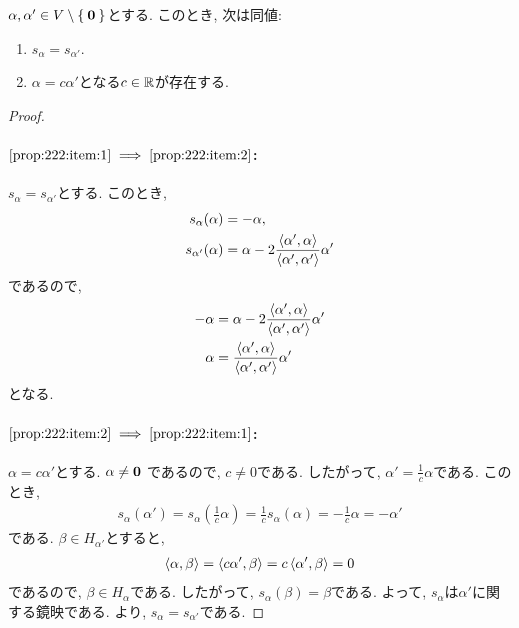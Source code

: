 \begin{prop}
  $\alpha, \alpha' \in V\setminus\Set{\boldsymbol{0}}$とする.
  このとき, 次は同値:
  \begin{enumerate}
  \item
    \label{prop:222:item:1}
    $s_\alpha=s_{\alpha'}$.
  \item
    \label{prop:222:item:2}
    $\alpha=c\alpha'$となる$c\in \mathbb{R}$が存在する.
  \end{enumerate}
\end{prop}
\begin{proof}
  \paragraph{ $\ref{prop:222:item:1}\implies\ref{prop:222:item:2}$:}
  $s_\alpha=s_{\alpha'}$とする.
  このとき,
  \begin{align*}
    s_\alpha(\alpha) &=-\alpha,\\
    s_{\alpha'} (\alpha) &= \alpha - 2\frac{\Braket{\alpha',\alpha}}{\Braket{\alpha',\alpha'}}\alpha'
  \end{align*}
  であるので,
  \begin{align*}
    -\alpha &= \alpha - 2\frac{\Braket{\alpha',\alpha}}{\Braket{\alpha',\alpha'}}\alpha'\\
    \alpha &= \frac{\Braket{\alpha',\alpha}}{\Braket{\alpha',\alpha'}}\alpha'
  \end{align*}
  となる.

  \paragraph{ $\ref{prop:222:item:2}\implies\ref{prop:222:item:1}$:}
  $\alpha=c\alpha'$とする.
  $\alpha\neq \boldsymbol{0}$
  であるので, $c\neq 0$である.
  したがって, $\alpha'=\frac{1}{c}\alpha$である.
  このとき,
  \begin{align*}
    s_{\alpha}(\alpha')=s_{\alpha}(\frac{1}{c}\alpha)=\frac{1}{c}s_{\alpha}(\alpha)=-\frac{1}{c}\alpha=-\alpha'
  \end{align*}
  である.
  $\beta \in H_{\alpha'}$とすると,
  \begin{align*}
    \Braket{\alpha,\beta}=\Braket{c\alpha',\beta}=c\Braket{\alpha',\beta}=0
  \end{align*}
  であるので, $\beta \in H_\alpha$である.
  したがって,
  $s_\alpha(\beta)=\beta$である.
  よって, $s_\alpha$は$\alpha'$に関する鏡映である.
  より, $s_\alpha=s_{\alpha'}$である.
\end{proof}


